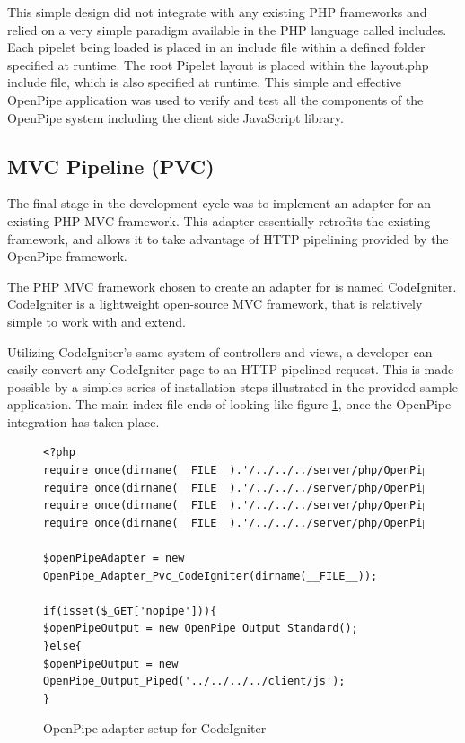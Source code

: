 \documentclass[12pt]{report}
\begin{document}
This simple design did not integrate with any existing PHP frameworks and relied on a very simple paradigm available in the PHP language called includes. Each pipelet being loaded is placed in an include file within a defined folder specified at runtime. The root Pipelet layout is placed within the layout.php include file,	 which is also specified at runtime. This simple and effective OpenPipe application was used to verify and test all the components of the OpenPipe system including the client side JavaScript library. 


\subsection{MVC Pipeline (PVC)}

The final stage in the development cycle was to implement an adapter for an existing PHP MVC framework. This adapter essentially retrofits the existing framework, and allows it to take advantage of HTTP pipelining provided by the OpenPipe framework. 

The PHP MVC framework chosen to create an adapter for is named CodeIgniter. CodeIgniter is a lightweight open-source MVC framework, that is relatively simple to work with and extend. 

Utilizing CodeIgniter’s same system of controllers and views, a developer can easily convert any CodeIgniter page to an HTTP pipelined request. This is made possible by a simples series of installation steps illustrated in the provided sample application. The main index file ends of looking like figure \ref{fig:codeIgniterPvcCode}, once the OpenPipe integration has taken place.

\begin{figure}[H]
\label{fig:codeIgniterPvcCode}
\begin{lstlisting}
<?php
require_once(dirname(__FILE__).'/../../../server/php/OpenPipe/Adapter/Pvc/CodeIgniter.php');
require_once(dirname(__FILE__).'/../../../server/php/OpenPipe/Output/Piped.php');
require_once(dirname(__FILE__).'/../../../server/php/OpenPipe/Output/Standard.php');
require_once(dirname(__FILE__).'/../../../server/php/OpenPipe/Runner.php');

$openPipeAdapter = new OpenPipe_Adapter_Pvc_CodeIgniter(dirname(__FILE__));

if(isset($_GET['nopipe'])){
$openPipeOutput = new OpenPipe_Output_Standard();	
}else{
$openPipeOutput = new OpenPipe_Output_Piped('../../../../client/js');	
}
\end{lstlisting}
\caption{OpenPipe adapter setup for CodeIgniter}
\end{figure}
\end{document}
